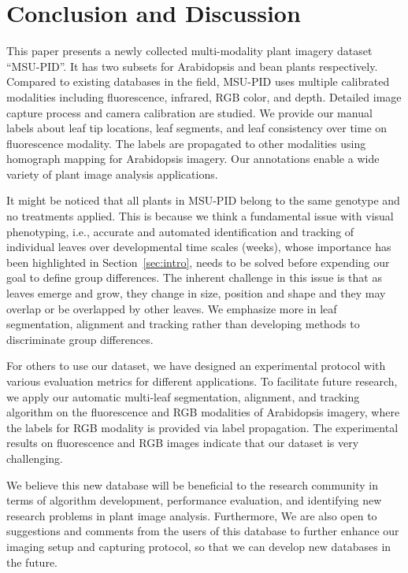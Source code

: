 \section{Conclusion and Discussion}

This paper presents a newly collected multi-modality plant imagery dataset ``MSU-PID''.
It has two subsets for Arabidopsis and bean plants respectively. 
Compared to existing databases in the field, MSU-PID uses multiple calibrated modalities including fluorescence, infrared, RGB color, and depth. 
Detailed image capture process and camera calibration are studied. 
We provide our manual labels about leaf tip locations, leaf segments, and leaf consistency over time on fluorescence modality. 
The labels are propagated to other modalities using homograph mapping for Arabidopsis imagery. 
Our annotations enable a wide variety of plant image analysis applications. 

It might be noticed that all plants in MSU-PID belong to the same genotype and no treatments applied.
This is because we think a fundamental issue with visual phenotyping, i.e., accurate and automated identification and tracking of individual leaves over developmental time scales (weeks), whose importance has been highlighted in Section~\ref{sec:intro}, needs to be solved before expending our goal to define group differences.
The inherent challenge in this issue is that as leaves emerge and grow, they change in size, position and shape and they may overlap or be overlapped by other leaves.
We emphasize more in leaf segmentation, alignment and tracking rather than developing methods to discriminate group differences.

For others to use our dataset, we have designed an experimental protocol with various evaluation metrics for different applications.  
To facilitate future research, we apply our automatic multi-leaf segmentation, alignment, and tracking algorithm on the fluorescence and RGB modalities of Arabidopsis imagery, where the labels for RGB modality is provided via label propagation. 
The experimental results on fluorescence and RGB images indicate that our dataset is very challenging. 

We believe this new database will be beneficial to the research community in terms of algorithm development, performance evaluation, and identifying new research problems in plant image analysis.
Furthermore, We are also open to suggestions and comments from the users of this database to further enhance our imaging setup and capturing protocol, so that we can develop new databases in the future.

